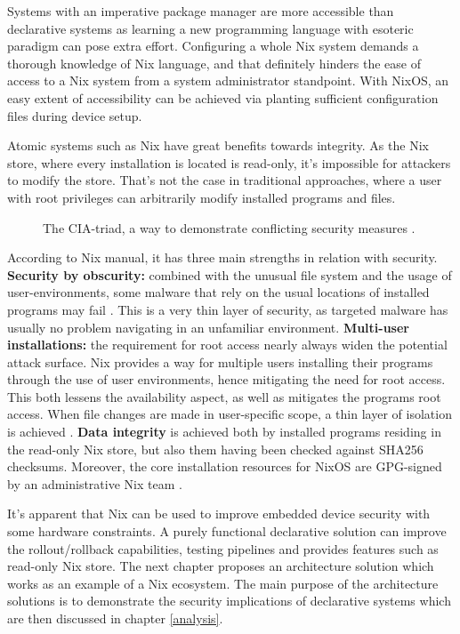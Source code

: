 Systems with an imperative package manager are more accessible than
declarative systems as learning a new programming language with
esoteric paradigm can pose extra effort. Configuring a whole Nix
system demands a thorough knowledge of Nix language, and that
definitely hinders the ease of access to a Nix system from a system
administrator standpoint. With NixOS, an easy extent of accessibility
can be achieved via planting sufficient configuration files during
device setup.

Atomic systems such as Nix have great benefits towards integrity. As
the Nix store, where every installation is located is read-only,
it's impossible for attackers to modify the store. That's not the
case in traditional approaches, where a user with root privileges can arbitrarily modify installed
programs and files.

\begin{figure}[t!]
\centerline{}
\caption{The CIA-triad, a way to demonstrate conflicting security
  measures \cite{hughes2013quantitative}.}
\label{ciatriad}
\end{figure}

According to Nix manual, it has three main strengths in relation with
security. \textbf{Security by obscurity: }combined with the unusual
file system and the usage of user-environments, some malware that rely
on the usual locations of installed programs may fail
\cite{nixosSecurityNixOS}. This is a very thin layer of security, as
targeted malware has usually no problem navigating in an unfamiliar
environment. \textbf{Multi-user installations: }the requirement for
root access nearly always widen the potential attack surface. Nix
provides a way for multiple users installing their programs through
the use of user environments, hence mitigating the need for root
access. This both lessens the availability aspect, as well as
mitigates the programs root access. When file changes are made in
user-specific scope, a thin layer of isolation is achieved
\cite{nixosNixOSManual}. \textbf{Data integrity} is achieved both by
installed programs residing in the read-only Nix store, but also them
having been checked against SHA256 checksums. Moreover, the core
installation resources for NixOS are GPG-signed by an administrative
Nix team \cite{nixosSecurityNixOS}.

It's apparent that Nix can be used to improve embedded device security
with some hardware constraints. A purely functional declarative
solution can improve the rollout/rollback capabilities, testing
pipelines and provides features such as read-only Nix store. The next
chapter proposes an architecture solution which works as an example of
a Nix ecosystem. The main purpose of the architecture solutions is to
demonstrate the security implications of declarative systems which are then discussed 
in chapter \ref{analysis}. 
